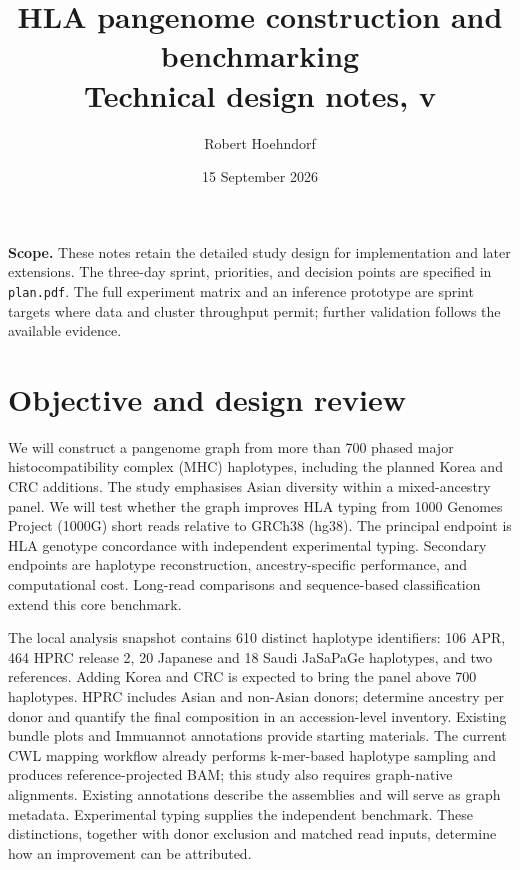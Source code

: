 \documentclass[10pt,a4paper]{article}
\title{HLA pangenome construction and benchmarking\\\large Technical design notes, v\planversion}
\author{Robert Hoehndorf}
\date{15 September 2026}
\begin{document}
\maketitle
\vspace{-1.5em}

\noindent\textbf{Scope.} These notes retain the detailed study design for implementation and later extensions. The three-day sprint, priorities, and decision points are specified in \texttt{plan.pdf}. The full experiment matrix and an inference prototype are sprint targets where data and cluster throughput permit; further validation follows the available evidence.

\section{Objective and design review}
We will construct a pangenome graph from more than 700 phased major
histocompatibility complex (MHC) haplotypes, including the planned Korea and CRC
additions. The study emphasises Asian diversity within a mixed-ancestry panel.
We will test whether the graph improves HLA typing from 1000 Genomes Project
(1000G) short reads relative to GRCh38 (hg38). The principal endpoint is HLA
genotype concordance with independent experimental typing. Secondary endpoints
are haplotype reconstruction, ancestry-specific performance, and computational
cost. Long-read comparisons and sequence-based classification extend this core
benchmark.

The local analysis snapshot contains 610 distinct haplotype identifiers:
106 APR, 464 HPRC release 2, 20 Japanese and 18 Saudi JaSaPaGe haplotypes,
and two references. Adding Korea and CRC is expected to bring the panel above
700 haplotypes. HPRC includes Asian and non-Asian donors; determine ancestry
per donor and quantify the final composition in an accession-level inventory.
Existing bundle plots and Immuannot
annotations provide starting materials. The current CWL mapping workflow already
performs k-mer-based haplotype sampling and produces reference-projected BAM;
this study also requires graph-native alignments. Existing annotations describe
the assemblies and will serve as graph metadata. Experimental typing supplies
the independent benchmark. These distinctions, together with donor exclusion
and matched read inputs, determine how an improvement can be attributed.
\end{document}
